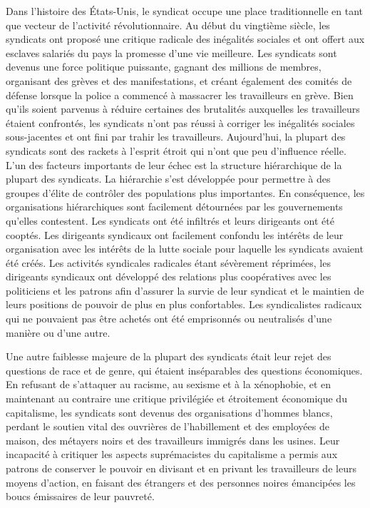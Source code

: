 Dans l'histoire des États-Unis, le syndicat occupe une place traditionnelle en tant que vecteur de l'activité révolutionnaire. Au début du vingtième siècle, les syndicats ont proposé une critique radicale des inégalités sociales et ont offert aux esclaves salariés du pays la promesse d'une vie meilleure. Les syndicats sont devenus une force politique puissante, gagnant des millions de membres, organisant des grèves et des manifestations, et créant également des comités de défense lorsque la police a commencé à massacrer les travailleurs en grève. Bien qu'ils soient parvenus à réduire certaines des brutalités auxquelles les travailleurs étaient confrontés, les syndicats n'ont pas réussi à corriger les inégalités sociales sous-jacentes et ont fini par trahir les travailleurs. Aujourd'hui, la plupart des syndicats sont des rackets à l'esprit étroit qui n'ont que peu d'influence réelle. L'un des facteurs importants de leur échec est la structure hiérarchique de la plupart des syndicats. La hiérarchie s'est développée pour permettre à des groupes d'élite de contrôler des populations plus importantes. En conséquence, les organisations hiérarchiques sont facilement détournées par les gouvernements qu'elles contestent. Les syndicats ont été infiltrés et leurs dirigeants ont été cooptés. Les dirigeants syndicaux ont facilement confondu les intérêts de leur organisation avec les intérêts de la lutte sociale pour laquelle les syndicats avaient été créés. Les activités syndicales radicales étant sévèrement réprimées, les dirigeants syndicaux ont développé des relations plus coopératives avec les politiciens et les patrons afin d'assurer la survie de leur syndicat et le maintien de leurs positions de pouvoir de plus en plus confortables. Les syndicalistes radicaux qui ne pouvaient pas être achetés ont été emprisonnés ou neutralisés d'une manière ou d'une autre.

Une autre faiblesse majeure de la plupart des syndicats était leur rejet des questions de race et de genre, qui étaient inséparables des questions économiques. En refusant de s'attaquer au racisme, au sexisme et à la xénophobie, et en maintenant au contraire une critique privilégiée et étroitement économique du capitalisme, les syndicats sont devenus des organisations d'hommes blancs, perdant le soutien vital des ouvrières de l'habillement et des employées de maison, des métayers noirs et des travailleurs immigrés dans les usines. Leur incapacité à critiquer les aspects suprémacistes du capitalisme a permis aux patrons de conserver le pouvoir en divisant et en privant les travailleurs de leurs moyens d'action, en faisant des étrangers et des personnes noires émancipées les boucs émissaires de leur pauvreté.

